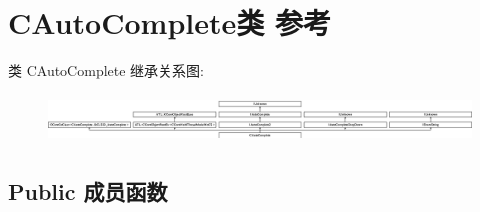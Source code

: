 \hypertarget{class_c_auto_complete}{}\section{C\+Auto\+Complete类 参考}
\label{class_c_auto_complete}
类 C\+Auto\+Complete 继承关系图\+:\begin{figure}[H]
\begin{center}
\leavevmode
\includegraphics[height=1.272727cm]{class_c_auto_complete}
\end{center}
\end{figure}
\subsection*{Public 成员函数}
